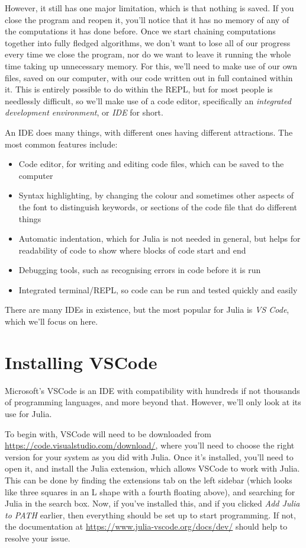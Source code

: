 \documentclass[
  letterpaper,
  DIV=11,
  numbers=noendperiod]{scrreprt}
\begin{document}
However, it still has one major limitation, which is that nothing is
saved. If you close the program and reopen it, you'll notice that it has
no memory of any of the computations it has done before. Once we start
chaining computations together into fully fledged algorithms, we don't
want to lose all of our progress every time we close the program, nor do
we want to leave it running the whole time taking up unnecessary memory.
For this, we'll need to make use of our own files, saved on our
computer, with our code written out in full contained within it. This is
entirely possible to do within the REPL, but for most people is
needlessly difficult, so we'll make use of a code editor, specifically
an \emph{integrated development environment}, or \emph{IDE} for short.

An IDE does many things, with different ones having different
attractions. The most common features include:

\begin{itemize}
\item
  Code editor, for writing and editing code files, which can be saved to
  the computer
\item
  Syntax highlighting, by changing the colour and sometimes other
  aspects of the font to distinguish keywords, or sections of the code
  file that do different things
\item
  Automatic indentation, which for Julia is not needed in general, but
  helps for readability of code to show where blocks of code start and
  end
\item
  Debugging tools, such as recognising errors in code before it is run
\item
  Integrated terminal/REPL, so code can be run and tested quickly and
  easily
\end{itemize}

There are many IDEs in existence, but the most popular for Julia is
\emph{VS Code}, which we'll focus on here.

\hypertarget{installing-vscode}{%
\section{Installing VSCode}\label{installing-vscode}}

Microsoft's VSCode is an IDE with compatibility with hundreds if not
thousands of programming languages, and more beyond that. However, we'll
only look at its use for Julia.

To begin with, VSCode will need to be downloaded from
\url{https://code.visualstudio.com/download/}, where you'll need to
choose the right version for your system as you did with Julia. Once
it's installed, you'll need to open it, and install the Julia extension,
which allows VSCode to work with Julia. This can be done by finding the
extensions tab on the left sidebar (which looks like three squares in an
L shape with a fourth floating above), and searching for Julia in the
search box. Now, if you've installed this, and if you clicked \emph{Add
Julia to PATH} earlier, then everything should be set up to start
programming. If not, the documentation at
\url{https://www.julia-vscode.org/docs/dev/} should help to resolve your
issue.
\end{document}
